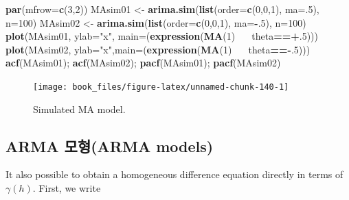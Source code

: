 \documentclass[b5paper,]{scrbook}
\makeatletter
\newenvironment{Shaded}{\begin{snugshade}}{\end{snugshade}}
\newcommand{\KeywordTok}[1]{\textcolor[rgb]{0.13,0.29,0.53}{\textbf{#1}}}
\newcommand{\DataTypeTok}[1]{\textcolor[rgb]{0.13,0.29,0.53}{#1}}
\newcommand{\DecValTok}[1]{\textcolor[rgb]{0.00,0.00,0.81}{#1}}
\newcommand{\StringTok}[1]{\textcolor[rgb]{0.31,0.60,0.02}{#1}}
\newcommand{\OperatorTok}[1]{\textcolor[rgb]{0.81,0.36,0.00}{\textbf{#1}}}
\newcommand{\ErrorTok}[1]{\textcolor[rgb]{0.64,0.00,0.00}{\textbf{#1}}}
\newcommand{\NormalTok}[1]{#1}
\theoremstyle{plain}
\theoremstyle{definition}
\numberwithin{equation}{section}
\newenvironment{kframe}{%
\medskip{}
\setlength{\fboxsep}{.8em}
 \def\at@end@of@kframe{}%
 \ifinner\ifhmode%
  \def\at@end@of@kframe{\end{minipage}}%
  \begin{minipage}{\columnwidth}%
 \fi\fi%
 \def\FrameCommand##1{\hskip\@totalleftmargin \hskip-\fboxsep
 \colorbox{shadecolor}{##1}\hskip-\fboxsep
     \hskip-\linewidth \hskip-\@totalleftmargin \hskip\columnwidth}%
 \MakeFramed {\advance\hsize-\width
   \@totalleftmargin\z@ \linewidth\hsize
   \@setminipage}}%
 {\par\unskip\endMakeFramed%
 \at@end@of@kframe}
\renewenvironment{Shaded}{\begin{kframe}}{\end{kframe}}
\makeatother
\begin{document}
\begin{Shaded}
\begin{Highlighting}[]
\KeywordTok{par}\NormalTok{(}\DataTypeTok{mfrow=}\KeywordTok{c}\NormalTok{(}\DecValTok{3}\NormalTok{,}\DecValTok{2}\NormalTok{))   }
\NormalTok{MAsim01 <-}\StringTok{ }\KeywordTok{arima.sim}\NormalTok{(}\KeywordTok{list}\NormalTok{(}\DataTypeTok{order=}\KeywordTok{c}\NormalTok{(}\DecValTok{0}\NormalTok{,}\DecValTok{0}\NormalTok{,}\DecValTok{1}\NormalTok{), }\DataTypeTok{ma=}\NormalTok{.}\DecValTok{5}\NormalTok{), }\DataTypeTok{n=}\DecValTok{100}\NormalTok{)}
\NormalTok{MAsim02 <-}\StringTok{ }\KeywordTok{arima.sim}\NormalTok{(}\KeywordTok{list}\NormalTok{(}\DataTypeTok{order=}\KeywordTok{c}\NormalTok{(}\DecValTok{0}\NormalTok{,}\DecValTok{0}\NormalTok{,}\DecValTok{1}\NormalTok{), }\DataTypeTok{ma=}\OperatorTok{-}\NormalTok{.}\DecValTok{5}\NormalTok{), }\DataTypeTok{n=}\DecValTok{100}\NormalTok{)}
\KeywordTok{plot}\NormalTok{(MAsim01, }\DataTypeTok{ylab=}\StringTok{"x"}\NormalTok{, }\DataTypeTok{main=}\NormalTok{(}\KeywordTok{expression}\NormalTok{(}\KeywordTok{MA}\NormalTok{(}\DecValTok{1}\NormalTok{)}\OperatorTok{~}\ErrorTok{~~}\NormalTok{theta}\OperatorTok{==+}\NormalTok{.}\DecValTok{5}\NormalTok{)))    }
\KeywordTok{plot}\NormalTok{(MAsim02, }\DataTypeTok{ylab=}\StringTok{"x"}\NormalTok{,}\DataTypeTok{main=}\NormalTok{(}\KeywordTok{expression}\NormalTok{(}\KeywordTok{MA}\NormalTok{(}\DecValTok{1}\NormalTok{)}\OperatorTok{~}\ErrorTok{~~}\NormalTok{theta}\OperatorTok{==-}\NormalTok{.}\DecValTok{5}\NormalTok{))) }
\KeywordTok{acf}\NormalTok{(MAsim01); }\KeywordTok{acf}\NormalTok{(MAsim02); }\KeywordTok{pacf}\NormalTok{(MAsim01); }\KeywordTok{pacf}\NormalTok{(MAsim02)}
\end{Highlighting}
\end{Shaded}

\begin{figure}

{\centering \texttt{[image: book\_files/figure-latex/unnamed-chunk-140-1]} 

}

\caption{Simulated MA model.}\label{fig:unnamed-chunk-140}
\end{figure}

\subsection{ARMA 모형(ARMA models)}\label{arma-arma-models}

It also possible to obtain a homogeneous difference equation directly in
terms of \(\gamma(h)\). First, we write
\end{document}
